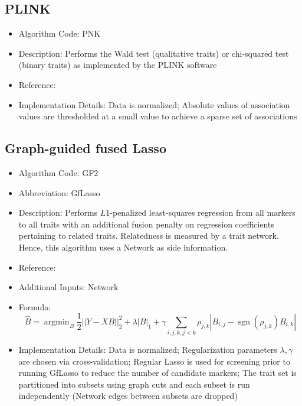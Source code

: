 \documentclass{article}
\newcommand{\sgn}{\operatorname{sgn}}
\newcommand{\argmin}{\operatorname{argmin}}
\begin{document}
\subsection{PLINK}

\begin{itemize}
\item Algorithm Code: PNK
\item Description: Performs the Wald test (qualitative traits) or chi-squared test (binary traits) as implemented by the PLINK software
\item Reference: \cite{PLINK}
\item Implementation Details: Data is normalized; Absolute values of association values are thresholded at a small value to achieve a sparse set of associations
\end{itemize}

\subsection{Graph-guided fused Lasso}

\begin{itemize}
\item Algorithm Code: GF2
\item Abbreviation: GfLasso
\item Description: Performs $L1$-penalized least-squares regression from all markers to all traits with an additional fusion penalty on regression coefficients pertaining to related traits. Relatedness is measured by a trait network. Hence, this algorithm uses a Network as side information. 
\item Reference: \cite{GfLasso}
\item Additional Inputs: Network
\item Formula:
\begin{equation*}
\hat{B} = \argmin_{B} \frac{1}{2}||Y - XB||_2^2 + \lambda|B|_1 + \gamma\sum_{i,j,k, j < k}\rho_{j,k}|B_{i,j} - \sgn(\rho_{j,k})B_{i,k}|
\end{equation*}
\item Implementation Details: Data is normalized; Regularization parameters $\lambda, \gamma$ are chosen via cross-validation; Regular Lasso is used for screening prior to running GfLasso to reduce the number of candidate markers; The trait set is partitioned into subsets using graph cuts and each subset is run independently (Network edges between subsets are dropped)

\end{itemize}
\end{document}
